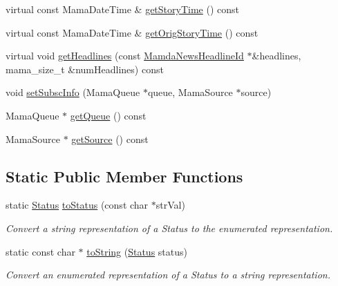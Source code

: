 \begin{CompactItemize}
\item 
virtual const Mama\-Date\-Time \& \hyperlink{classWombat_1_1MamdaNewsStory_43d2330b3a2719ff048c789c5dae5023}{get\-Story\-Time} () const 
\item 
virtual const Mama\-Date\-Time \& \hyperlink{classWombat_1_1MamdaNewsStory_c71d0f49e28e1a631efd0a48506e02ba}{get\-Orig\-Story\-Time} () const 
\item 
virtual void \hyperlink{classWombat_1_1MamdaNewsStory_754f3330dc60b7607954fca775fcc6db}{get\-Headlines} (const \hyperlink{namespaceWombat_cb354a5fc91d5b728f8f1255aae3e196}{Mamda\-News\-Headline\-Id} $\ast$\&headlines, mama\_\-size\_\-t \&num\-Headlines) const 
\item 
void \hyperlink{classWombat_1_1MamdaNewsStory_4e9e643b30eb88c77f2e8c2a38c189be}{set\-Subsc\-Info} (Mama\-Queue $\ast$queue, Mama\-Source $\ast$source)
\item 
Mama\-Queue $\ast$ \hyperlink{classWombat_1_1MamdaNewsStory_20c50ea2ba2a142f047da1971bbc3e25}{get\-Queue} () const 
\item 
Mama\-Source $\ast$ \hyperlink{classWombat_1_1MamdaNewsStory_3078ae43414bf47490f7e0a15c489d2b}{get\-Source} () const 
\end{CompactItemize}
\subsection*{Static Public Member Functions}
\begin{CompactItemize}
\item 
static \hyperlink{classWombat_1_1MamdaNewsStory_25ee81ce6b01be03a95ab954acdb1e6d}{Status} \hyperlink{classWombat_1_1MamdaNewsStory_801fa0d5802139ab91e348b3935d10fa}{to\-Status} (const char $\ast$str\-Val)
\begin{CompactList}\small\item\em Convert a string representation of a Status to the enumerated representation. \item\end{CompactList}\item 
static const char $\ast$ \hyperlink{classWombat_1_1MamdaNewsStory_8067357e141e25f851e7a383ae5da62e}{to\-String} (\hyperlink{classWombat_1_1MamdaNewsStory_25ee81ce6b01be03a95ab954acdb1e6d}{Status} status)
\begin{CompactList}\small\item\em Convert an enumerated representation of a Status to a string representation. \item\end{CompactList}\end{CompactItemize}


